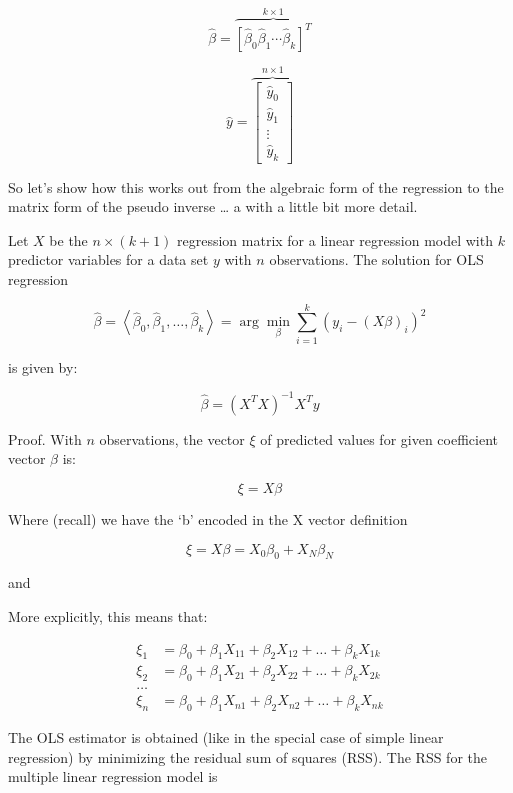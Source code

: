 \documentclass[
  12 pt,
  a4paper,
]{book}
\numberwithin{equation}{section}
\theoremstyle{plain}      %
\theoremstyle{definition} %
\theoremstyle{remark}     %
\theoremstyle{note}         %
\begin{document}
\[
\hat{\beta}=
\overbrace{
\left[\hat{\beta}_{0} \hat{\beta}_{1} \cdots \hat{\beta}_{k}\right]^{T} 
}^{k \times 1}
\]

\[
\hat{y}=
\overbrace{\left[\begin{array}{c}
\hat{y}_{0} \\
\hat{y}_{1} \\
\vdots \\
\hat{y}_{k}
\end{array}\right]
}^{n \times 1}
\]

So let's show how this works out from the algebraic form of the
regression to the matrix form of the pseudo inverse \ldots{} a with a
little bit more detail.

Let \(X\) be the \(n \times(k+1)\) regression matrix for a linear
regression model with \(k\) predictor variables for a data set \(y\)
with \(n\) observations. The solution for OLS regression

\[
\hat{\beta}=\left\langle\hat{\beta}_{0}, \hat{\beta}_{1}, \ldots, \hat{\beta}_{k}\right\rangle=\arg \min _{\beta} \sum_{i=1}^{k}\left(y_{i}-(X \beta)_{i}\right)^{2}
\]

is given by:

\[
\hat{\beta}=\left(X^{T} X\right)^{-1} X^{T} y
\]

Proof. With \(n\) observations, the vector \(\xi\) of predicted values
for given coefficient vector \(\beta\) is:

\[
\xi=X \beta
\]

Where (recall) we have the `b' encoded in the X vector definition

\[
\xi=X \beta= X_{0 } \beta_{0} + X_{N} \beta_{N}
\]

and

More explicitly, this means that:

\[
\begin{aligned}
\xi_{1} &=\beta_{0}+\beta_{1} X_{11}+\beta_{2} X_{12}+\ldots+\beta_{k} X_{1 k} \\
\xi_{2} &=\beta_{0}+\beta_{1} X_{21}+\beta_{2} X_{22}+\ldots+\beta_{k} X_{2 k} \\
\ldots & \\
\xi_{n} &=\beta_{0}+\beta_{1} X_{n 1}+\beta_{2} X_{n 2}+\ldots+\beta_{k} X_{n k}
\end{aligned}
\]

The OLS estimator is obtained (like in the special case of simple linear
regression) by minimizing the residual sum of squares (RSS). The RSS for
the multiple linear regression model is
\end{document}

